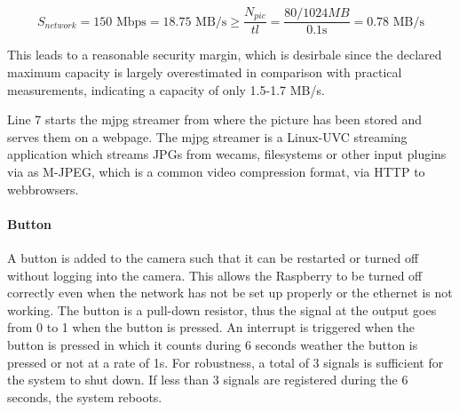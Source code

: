 \begin{equation}
    S_{network} = 150 \text{ Mbps} = 18.75 \text{ MB/s} \geq \frac{N_{pic}}{tl}  = \frac{80/1024 MB}{0.1\text{s}}= 0.78 \text{ MB/s}
\end{equation}

This leads to a reasonable security margin, which is desirbale since the declared maximum capacity is largely overestimated in comparison with practical measurements, indicating a capacity of only 1.5-1.7 MB/s.

Line 7 starts the mjpg streamer from where the picture has been stored and serves them on a webpage. The mjpg streamer is a Linux-UVC streaming application which streams JPGs from wecams, filesystems or other input plugins via as M-JPEG, which is a common video compression format, via HTTP to webbrowsers.

\paragraph{Button}

A button is added to the camera such that it can be restarted or turned off without logging into the camera. This allows the Raspberry to be turned off correctly even when the network has not be set up properly or the ethernet is not working.
The button is a pull-down resistor, thus the signal at the output goes from 0 to 1 when the button is pressed. An interrupt is triggered when the button is pressed in which it counts during 6 seconds weather the button is pressed or not at a rate of 1s. For robustness, a total of 3 signals is sufficient for the system to shut down. If less than 3 signals are registered during the 6 seconds, the system reboots. 

